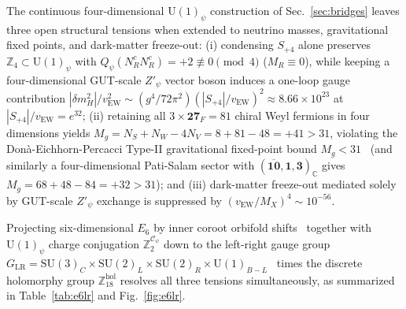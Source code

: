 \documentclass[aps,prd,twocolumn,nofootinbib,floatfix]{revtex4-2}
\begin{document}
The continuous four-dimensional $\mathrm{U}(1)_\psi$ construction of Sec.~\ref{sec:bridges} leaves three open structural tensions when extended to neutrino masses, gravitational fixed points, and dark-matter freeze-out: (i) condensing $S_{+4}$ alone preserves $\mathbb{Z}_4 \subset \mathrm{U}(1)_\psi$ with $Q_\psi(N_R^c N_R^c) = +2 \not\equiv 0 \pmod 4$ ($M_R \equiv 0$), while keeping a four-dimensional GUT-scale $Z'_\psi$ vector boson induces a one-loop gauge contribution $|\delta m_H^2|/v_{\mathrm{EW}}^2 \sim (g^4/72\pi^2)(|S_{+4}|/v_{\mathrm{EW}})^2 \approx 8.66\times 10^{23}$ at $|S_{+4}|/v_{\mathrm{EW}} = e^{32}$; (ii) retaining all $3 \times \mathbf{27}_F = 81$ chiral Weyl fermions in four dimensions yields $M_g = N_S + N_W - 4 N_V = 8 + 81 - 48 = +41 > 31$, violating the Don\`a-Eichhorn-Percacci Type-II gravitational fixed-point bound $M_g < 31$~\cite{DonaEichhornPercacci2014} (and similarly a four-dimensional Pati-Salam sector with $(\overline{\mathbf{10}},\mathbf{1},\mathbf{3})_{\mathbb{C}}$ gives $M_g = 68 + 48 - 84 = +32 > 31$); and (iii) dark-matter freeze-out mediated solely by GUT-scale $Z'_\psi$ exchange is suppressed by $(v_{\mathrm{EW}}/M_X)^4 \sim 10^{-56}$.

Projecting six-dimensional $E_6$ by inner coroot orbifold shifts~\cite{Kawamura2001,HallNomura2001} together with $\mathrm{U}(1)_\psi$ charge conjugation $\mathbb{Z}_2^{\mathcal{C}_\psi}$ down to the left-right gauge group $G_{\mathrm{LR}} = \mathrm{SU}(3)_C \times \mathrm{SU}(2)_L \times \mathrm{SU}(2)_R \times \mathrm{U}(1)_{B-L}$~\cite{SenjanovicMohapatra1975} times the discrete holomorphy group $\mathbb{Z}_{18}^{\mathrm{hol}}$ resolves all three tensions simultaneously, as summarized in Table~\ref{tab:e6lr} and Fig.~\ref{fig:e6lr}.
\end{document}
